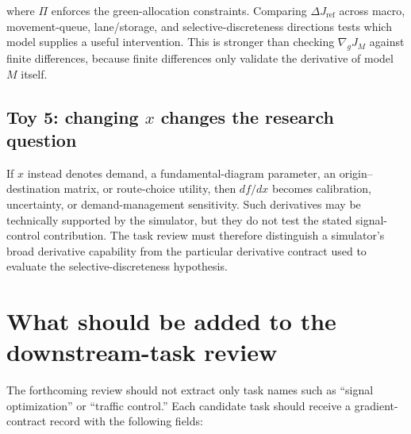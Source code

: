 \documentclass[11pt,a4paper]{article}
\begin{document}
where $\Pi$ enforces the green-allocation constraints. Comparing $\Delta J_{\mathrm{ref}}$ across macro, movement-queue, lane/storage, and selective-discreteness directions tests which model supplies a useful intervention. This is stronger than checking $\nabla_gJ_M$ against finite differences, because finite differences only validate the derivative of model $M$ itself.

\subsection{Toy 5: changing $x$ changes the research question}

If $x$ instead denotes demand, a fundamental-diagram parameter, an origin--destination matrix, or route-choice utility, then $df/dx$ becomes calibration, uncertainty, or demand-management sensitivity. Such derivatives may be technically supported by the simulator, but they do not test the stated signal-control contribution. The task review must therefore distinguish a simulator's broad derivative capability from the particular derivative contract used to evaluate the selective-discreteness hypothesis.

\section{What should be added to the downstream-task review}

The forthcoming review should not extract only task names such as ``signal optimization'' or ``traffic control.'' Each candidate task should receive a gradient-contract record with the following fields:
\end{document}

